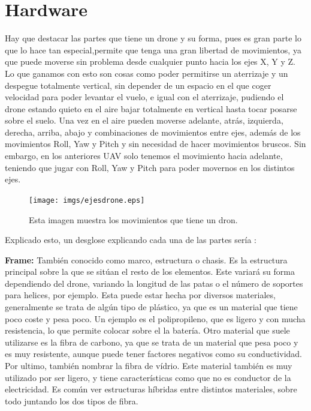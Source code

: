 \section{Hardware}
\hspace{1 cm} Hay que destacar las partes que tiene un drone y su forma, pues es gran parte lo que lo hace tan especial,permite que tenga una gran libertad de movimientos, ya que puede moverse sin problema desde cualquier punto hacia los ejes X, Y y Z. Lo que ganamos con esto son cosas como poder permitirse un aterrizaje y un despegue totalmente vertical, sin depender de un espacio en el que coger velocidad para poder levantar el vuelo, e igual con el aterrizaje, pudiendo el drone estando quieto en el aire bajar totalmente en vertical hasta tocar posarse sobre el suelo. Una vez en el aire pueden moverse adelante, atr\'as, izquierda, derecha, arriba, abajo y combinaciones de movimientos entre ejes, adem\'as de los movimientos Roll, Yaw y Pitch y sin necesidad de hacer movimientos bruscos. Sin embargo, en los anteriores UAV solo tenemos el movimiento hacia adelante, teniendo que jugar con Roll, Yaw y Pitch para poder movernos en los distintos ejes.

\begin{figure}[ht]
	\centering
		\texttt{[image: imgs/ejesdrone.eps]}
		\caption{Esta imagen muestra los movimientos que tiene un dron.}
	\label{fig:ejesdrone}
\end{figure}

\hspace{1 cm} Explicado esto, un desglose explicando cada una de las partes ser\'ia :

\hspace{1 cm}\textbf{Frame:} Tambi\'en conocido como marco, estructura o chasis. Es la estructura principal sobre la que se sit\'uan el resto de los elementos. Este variar\'a su forma dependiendo del drone, variando la longitud de las patas o el n\'umero de soportes para helices, por ejemplo. Esta puede estar hecha por diversos materiales, generalmente se trata de alg\'un tipo de pl\'astico, ya que es un material que tiene poco coste y pesa poco. Un ejemplo es el polipropileno, que es ligero y con mucha resistencia, lo que permite colocar sobre el la bater\'ia. Otro material que suele utilizarse es la fibra de carbono, ya que se trata de un material que pesa poco y es muy resistente, aunque puede tener factores negativos como su conductividad. Por ultimo, tambi\'en nombrar la fibra de v\'idrio. Este material tambi\'en es muy utilizado por ser ligero, y tiene caracter\'isticas como que no es conductor de la electricidad. Es com\'un ver estructuras h\'ibridas entre distintos materiales, sobre todo juntando los dos tipos de fibra. 


